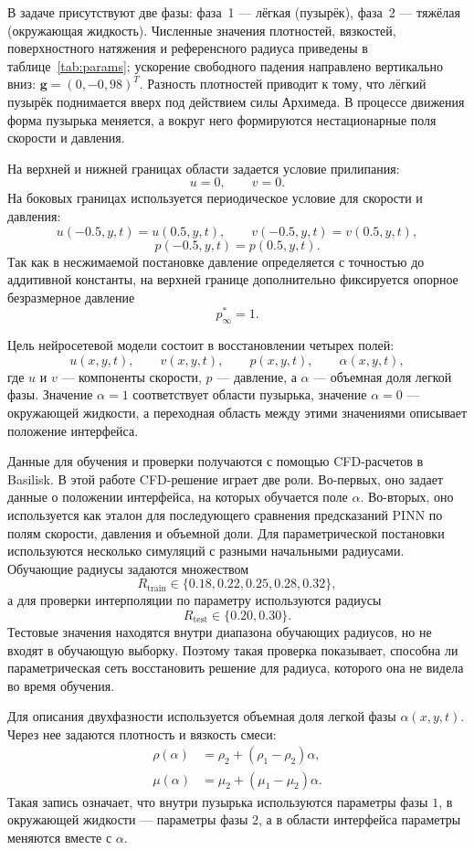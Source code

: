 \documentclass[12pt,a4paper]{article}
\begin{document}
В задаче присутствуют две фазы: фаза~1 --- лёгкая (пузырёк), фаза~2 --- тяжёлая
(окружающая жидкость). Численные значения плотностей, вязкостей, поверхностного
натяжения и референсного радиуса приведены в таблице~\ref{tab:params};
ускорение свободного падения направлено вертикально вниз:
$\mathbf{g}=(0,{-}0{,}98)^T$.
Разность плотностей приводит к тому, что лёгкий пузырёк поднимается вверх под
действием силы Архимеда. В процессе движения форма пузырька меняется, а вокруг
него формируются нестационарные поля скорости и давления.

На верхней и нижней границах области задается условие прилипания:
\[
    u=0,\qquad v=0.
\]
На боковых границах используется периодическое условие для скорости и давления:
\[
    u(-0.5,y,t)=u(0.5,y,t),
    \qquad
    v(-0.5,y,t)=v(0.5,y,t),
\]
\[
    p(-0.5,y,t)=p(0.5,y,t).
\]
Так как в несжимаемой постановке давление определяется с точностью до
аддитивной константы, на верхней границе дополнительно фиксируется опорное
безразмерное давление
\[
    p_\infty^*=1.
\]

Цель нейросетевой модели состоит в восстановлении четырех полей:
\[
    u(x,y,t),\qquad v(x,y,t),\qquad p(x,y,t),\qquad \alpha(x,y,t),
\]
где \(u\) и \(v\) --- компоненты скорости, \(p\) --- давление, а \(\alpha\) ---
объемная доля легкой фазы. Значение \(\alpha=1\) соответствует области
пузырька, значение \(\alpha=0\) --- окружающей жидкости, а переходная область
между этими значениями описывает положение интерфейса.

Данные для обучения и проверки получаются с помощью CFD-расчетов в Basilisk.
В этой работе CFD-решение играет две роли. Во-первых, оно задает данные о
положении интерфейса, на которых обучается поле \(\alpha\). Во-вторых, оно
используется как эталон для последующего сравнения предсказаний PINN по полям
скорости, давления и объемной доли. Для параметрической постановки используются
несколько симуляций с разными начальными радиусами. Обучающие радиусы задаются
множеством
\[
    R_{\mathrm{train}}\in\{0.18,0.22,0.25,0.28,0.32\},
\]
а для проверки интерполяции по параметру используются радиусы
\[
    R_{\mathrm{test}}\in\{0.20,0.30\}.
\]
Тестовые значения находятся внутри диапазона обучающих радиусов, но не входят в
обучающую выборку. Поэтому такая проверка показывает, способна ли
параметрическая сеть восстановить решение для радиуса, которого она не видела
во время обучения.

Для описания двухфазности используется объемная доля легкой фазы
\(\alpha(x,y,t)\). Через нее задаются плотность и вязкость смеси:
\begin{align}
    \rho(\alpha) &= \rho_2 + (\rho_1-\rho_2)\alpha, \\
    \mu(\alpha) &= \mu_2 + (\mu_1-\mu_2)\alpha.
    \label{eq:chapter2_rho_mu}
\end{align}
Такая запись означает, что внутри пузырька используются параметры фазы \(1\), в
окружающей жидкости --- параметры фазы \(2\), а в области интерфейса параметры
меняются вместе с \(\alpha\).
\end{document}
